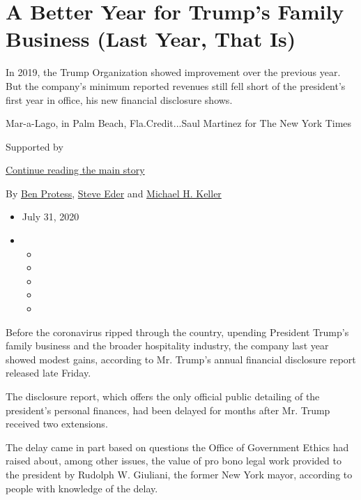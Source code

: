\hypertarget{a-better-year-for-trumps-family-business-last-year-that-is}{%
\section{A Better Year for Trump's Family Business (Last Year, That
Is)}\label{a-better-year-for-trumps-family-business-last-year-that-is}}

In 2019, the Trump Organization showed improvement over the previous
year. But the company's minimum reported revenues still fell short of
the president's first year in office, his new financial disclosure
shows.

Mar-a-Lago, in Palm Beach, Fla.Credit...Saul Martinez for The New York
Times

Supported by

\protect\hyperlink{after-sponsor}{Continue reading the main story}

By \href{https://www.nytimes.com/by/ben-protess}{Ben Protess},
\href{https://www.nytimes.com/by/steve-eder}{Steve Eder} and
\href{https://www.nytimes.com/by/michael-h-keller}{Michael H. Keller}

\begin{itemize}
\item
  July 31, 2020
\item
  \begin{itemize}
  \item
  \item
  \item
  \item
  \item
  \end{itemize}
\end{itemize}

Before the coronavirus ripped through the country, upending President
Trump's family business and the broader hospitality industry, the
company last year showed modest gains, according to Mr. Trump's annual
financial disclosure report released late Friday.

The disclosure report, which offers the only official public detailing
of the president's personal finances, had been delayed for months after
Mr. Trump received two extensions.

The delay came in part based on questions the Office of Government
Ethics had raised about, among other issues, the value of pro bono legal
work provided to the president by Rudolph W. Giuliani, the former New
York mayor, according to people with knowledge of the delay.

